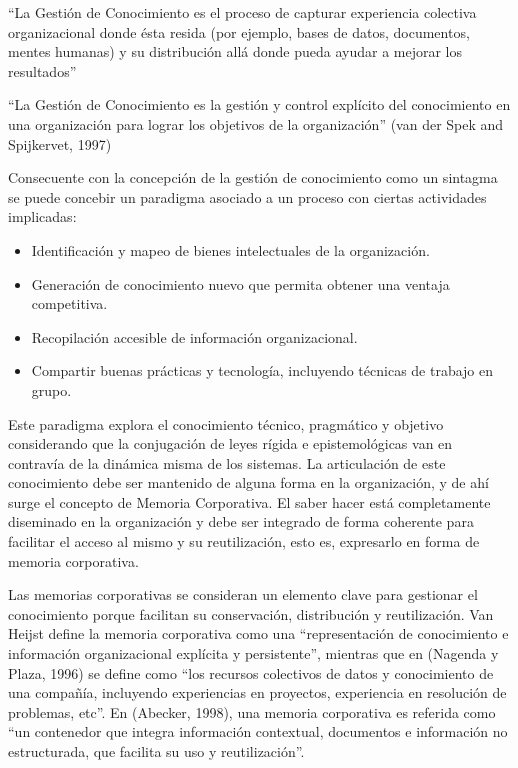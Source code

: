 “La Gestión de Conocimiento es el proceso de capturar experiencia colectiva organizacional donde ésta resida (por ejemplo, bases de datos, documentos, mentes humanas) y su distribución allá donde pueda ayudar a mejorar los resultados”\cite{hibbard1997}

“La Gestión de Conocimiento es la gestión y control explícito del conocimiento en una organización para lograr los objetivos de la organización” (van der Spek and Spijkervet, 1997)

Consecuente con la concepción de la gestión de conocimiento como un sintagma se puede concebir un paradigma asociado a un proceso con ciertas actividades implicadas: 

\begin{itemize}
\item Identificación y mapeo de bienes intelectuales de la organización.
\item Generación de conocimiento nuevo que permita obtener una ventaja competitiva. 
\item Recopilación accesible de información organizacional. 
\item Compartir buenas prácticas y tecnología, incluyendo técnicas de trabajo en grupo.
\end{itemize}

Este paradigma explora el conocimiento técnico, pragmático y objetivo considerando que la conjugación de leyes rígida e epistemológicas van en contravía de la dinámica misma de los sistemas. La articulación de este conocimiento debe ser mantenido de alguna forma en la organización, y de ahí surge el concepto de Memoria Corporativa. El saber hacer está completamente diseminado en la organización y debe ser integrado de forma coherente para facilitar el acceso al mismo y su reutilización, esto es, expresarlo en forma de memoria corporativa. 

Las memorias corporativas se consideran un elemento clave para gestionar el conocimiento porque facilitan su conservación, distribución y reutilización. Van Heijst define la memoria corporativa como una “representación de conocimiento e información organizacional explícita y persistente”, mientras que en (Nagenda y Plaza, 1996) se define como “los recursos colectivos de datos y conocimiento de una compañía, incluyendo experiencias en proyectos, experiencia en resolución de problemas, etc”. En (Abecker, 1998), una memoria corporativa es referida como “un contenedor que integra información contextual, documentos e información no estructurada, que facilita su uso y reutilización”.

